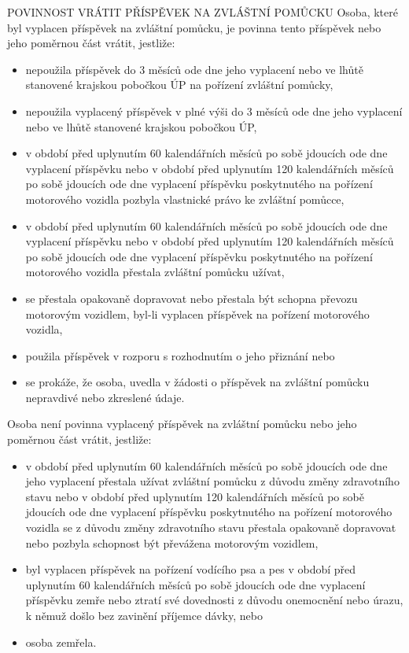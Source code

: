 \documentclass[thesis=M,czech]{FITthesis}[2012/06/26]
\begin{document}
POVINNOST VRÁTIT PŘÍSPĚVEK NA ZVLÁŠTNÍ POMŮCKU
Osoba, které byl vyplacen příspěvek na zvláštní pomůcku, je povinna tento
příspěvek nebo jeho poměrnou část vrátit, jestliže:
\begin{itemize}
    \item nepoužila příspěvek do 3 měsíců ode dne jeho vyplacení nebo ve
lhůtě stanovené krajskou pobočkou ÚP na pořízení zvláštní pomůcky,
    \item nepoužila vyplacený příspěvek v plné výši do 3 měsíců ode dne
jeho vyplacení nebo ve lhůtě stanovené krajskou pobočkou ÚP,
    \item v období před uplynutím 60 kalendářních měsíců po sobě jdoucích
ode dne vyplacení příspěvku nebo v období před uplynutím 120 kalendářních
měsíců po sobě jdoucích ode dne vyplacení     příspěvku poskytnutého na
pořízení motorového vozidla pozbyla vlastnické právo ke zvláštní pomůcce,
    \item v období před uplynutím 60 kalendářních měsíců po sobě jdoucích
ode dne vyplacení příspěvku nebo v období před uplynutím 120 kalendářních
měsíců po sobě jdoucích ode dne vyplacení     příspěvku poskytnutého na
pořízení motorového vozidla přestala zvláštní pomůcku užívat,
    \item se přestala opakovaně dopravovat nebo přestala být schopna
převozu motorovým vozidlem, byl-li vyplacen příspěvek na pořízení motorového
vozidla,
    \item použila příspěvek v rozporu s rozhodnutím o jeho přiznání nebo
    \item se prokáže, že osoba, uvedla v žádosti o příspěvek na zvláštní
pomůcku nepravdivé nebo zkreslené údaje.
\end{itemize}

Osoba není povinna vyplacený příspěvek na zvláštní pomůcku nebo jeho
poměrnou část vrátit, jestliže:
\begin{itemize}
    \item v období před uplynutím 60 kalendářních měsíců po sobě jdoucích
ode dne jeho vyplacení přestala užívat zvláštní pomůcku z důvodu změny
zdravotního stavu nebo v období před uplynutím     120 kalendářních měsíců po
sobě jdoucích ode dne vyplacení příspěvku poskytnutého na pořízení
motorového vozidla se z důvodu změny zdravotního stavu přestala opakovaně
dopravovat nebo     pozbyla schopnost být převážena motorovým vozidlem,
    \item byl vyplacen příspěvek na pořízení vodícího psa a pes v období
před uplynutím 60 kalendářních měsíců po sobě jdoucích ode dne vyplacení
příspěvku zemře nebo ztratí své dovednosti z důvodu     onemocnění nebo
úrazu, k němuž došlo bez zavinění příjemce dávky, nebo
    \item osoba zemřela.
\end{itemize}
\end{document}
